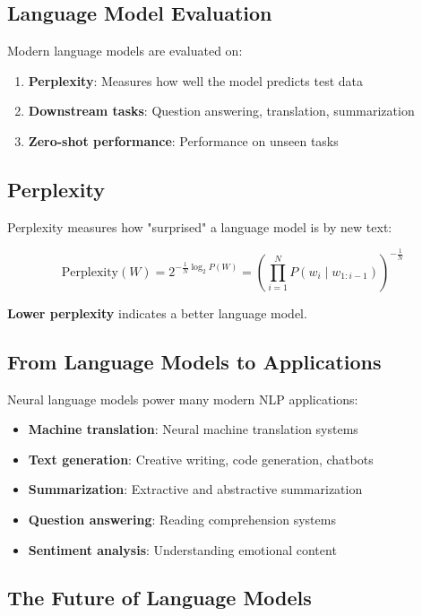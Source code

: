 \documentclass[11pt,a4paper]{article}
\theoremstyle{definition}
\theoremstyle{plain}
\theoremstyle{remark}
\begin{document}
\subsection{Language Model Evaluation}

Modern language models are evaluated on:

\begin{enumerate}
    \item \textbf{Perplexity}: Measures how well the model predicts test data
    \item \textbf{Downstream tasks}: Question answering, translation, summarization
    \item \textbf{Zero-shot performance}: Performance on unseen tasks
\end{enumerate}

\subsection{Perplexity}

Perplexity measures how "surprised" a language model is by new text:

\[
\text{Perplexity}(W) = 2^{-\frac{1}{N} \log_2 P(W)} = \left( \prod_{i=1}^N P(w_i \mid w_{1:i-1}) \right)^{-\frac{1}{N}}
\]

\textbf{Lower perplexity} indicates a better language model.

\subsection{From Language Models to Applications}

Neural language models power many modern NLP applications:

\begin{itemize}
    \item \textbf{Machine translation}: Neural machine translation systems
    \item \textbf{Text generation}: Creative writing, code generation, chatbots
    \item \textbf{Summarization}: Extractive and abstractive summarization
    \item \textbf{Question answering}: Reading comprehension systems
    \item \textbf{Sentiment analysis}: Understanding emotional content
\end{itemize}

\subsection{The Future of Language Models}
\end{document}
